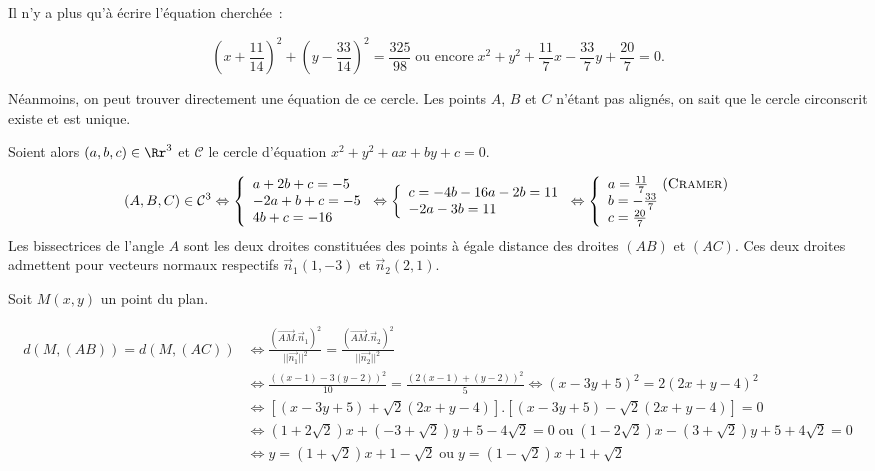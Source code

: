 {\begin{enumerate}
{Il n'y a plus qu'à écrire l'équation cherchée~:

$$(x+\frac{11}{14})^2+(y-\frac{33}{14})^2=\frac{325}{98}\;\mbox{ou encore}\;
x^2+y^2+\frac{11}{7}x-\frac{33}{7}y+\frac{20}{7}=0.$$

Néanmoins, on peut trouver directement une équation de ce cercle. Les points $A$, $B$ et $C$ n'étant pas alignés, on sait que le cercle circonscrit existe et est unique.

Soient alors $(a,b,c)\in\Rr^3$ et $\mathcal{C}$ le cercle d'équation $x^2+y^2+ax+by+c=0$.

\begin{align*}
(A,B,C)\in\mathcal{C}^3&\Leftrightarrow
\left\{
\begin{array}{l}
a+2b+c=-5\\
-2a+b+c=-5\\
4b+c=-16
\end{array}
\right.\Leftrightarrow
\left\{
\begin{array}{l}
c=-4b-16
a-2b=11\\
-2a-3b=11
\end{array}\right.
\Leftrightarrow
\left\{
\begin{array}{l}
a=\frac{11}{7}\quad(\mbox{\textsc{Cramer}})\\
b=-\frac{33}{7}\\
c=\frac{20}{7}
\end{array}
\right. 
\end{align*}
Les bissectrices de l'angle $A$ sont les deux droites constituées des points à égale distance des droites $(AB)$ et $(AC)$. Ces deux droites admettent pour vecteurs normaux respectifs $\vec{n}_1(1,-3)$ et $\vec{n}_2(2,1)$.

Soit $M(x,y)$ un point du plan.

\begin{align*}
d(M,(AB))=d(M,(AC))&\Leftrightarrow \frac{(\overrightarrow{AM}.\vec{n}_1)^2}{||\vec{n_1}||^2}=\frac{(\overrightarrow{AM}.\vec{n}_2)^2}{||\vec{n_2}||^2}\\
 &\Leftrightarrow\frac{((x-1)-3(y-2))^2}{10}=\frac{(2(x-1)+(y-2))^2}{5}\Leftrightarrow(x-3y+5)^2=2(2x+y-4)^2\\
 &\Leftrightarrow[(x-3y+5)+\sqrt{2}(2x+y-4)].[(x-3y+5)-\sqrt{2}(2x+y-4)]=0\\
 &\Leftrightarrow(1+2\sqrt{2})x+(-3+\sqrt{2})y+5-4\sqrt{2}=0\;\mbox{ou}\;(1-2\sqrt{2})x-(3+\sqrt{2})y+5+4\sqrt{2}=0\\
 &\Leftrightarrow y=(1+\sqrt{2})x+1-\sqrt{2}\;\mbox{ou}\;y=(1-\sqrt{2})x+1+\sqrt{2}
\end{align*}

}
\end{enumerate}}
